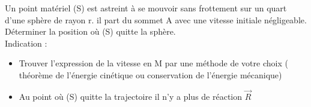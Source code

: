 \documentclass[10pt,a4paper]{article}
\begin{document}
\begin{tcolorbox}[sabour,title=EXERCICE 20]
\begin{minipage}{11cm}
Un point matériel (S) est astreint à se mouvoir sans frottement sur un quart d'une sphère de rayon r. il part du sommet A avec une vitesse initiale négligeable. Déterminer la position où (S) quitte la sphère. \\


Indication : 
\begin{itemize}
\item Trouver l'expression de la vitesse en M par une méthode de votre choix ( théorème de l'énergie cinétique ou conservation de l'énergie mécanique)
\item Au point où (S) quitte la trajectoire  il n'y a plus de réaction $\vec{R}$ 
\end{itemize}
\end{minipage}
\begin{minipage}{8cm}
\end{minipage}

\end{tcolorbox}
\end{document}
